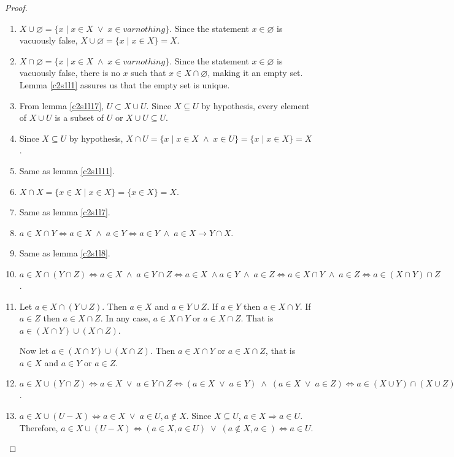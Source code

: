 \begin{proof}
\begin{enumerate}
\item $X \cup \varnothing = \{x\;|\; x \in X \;\lor\; x \in varnothing\}$.
Since the statement $x \in \varnothing$ is vacuously false, $X \cup 
\varnothing = \{x\;|\; x \in X\} = X$.
\item $X \cap \varnothing = \{x\;|\; x \in X \;\land\; x \in varnothing\}$.
Since the statement $x \in \varnothing$ is vacuously false, there is no
$x$ such that $x \in X \cap \varnothing$, making it an empty set. Lemma
\ref{c2s1l1} assures us that the empty set is unique.
\item From lemma \ref{c2s1l17}, $U \subset X \cup U$. Since $X \subseteq
U$ by hypothesis, every element of $X \cup U$ is a subset of $U$ or $X 
\cup U \subseteq U$.
\item Since $X \subseteq U$ by hypothesis, $X \cap U = \{x\;|\; x \in X 
\;\land \; x \in U\} = \{x\;|\; x \in X\} = X$.
\item Same as lemma \ref{c2s1l11}.
\item $X \cap X = \{x \in X \;|\; x \in X\} = \{x \in X\} = X$.
\item Same as lemma \ref{c2s1l7}.
\item $a \in X \cap Y \Leftrightarrow a \in X \;\land\; a \in Y 
\Leftrightarrow a \in Y \;\land\; a \in X \rightarrow Y \cap X$.
\item Same as lemma \ref{c2s1l8}.
\item $a \in X \cap (Y \cap Z) \Leftrightarrow a \in X \;\land\; a \in 
Y \cap Z \Leftrightarrow a \in X \;\land a \in Y \;\land\; a \in Z
\Leftrightarrow a \in X \cap Y \;\land\; a \in Z \Leftrightarrow a \in
(X \cap Y) \cap Z$.
\item Let $a \in X \cap (Y \cup Z)$. Then $a \in X$ and $a \in Y \cup Z$.
If $a \in Y$ then $a \in X \cap Y$. If $a \in Z$ then $a \in X \cap Z$. In
any case, $a \in X \cap Y$ or $a \in X \cap Z$. That is $a \in (X \cap Y) 
\cup (X \cap Z)$.

Now let $a \in (X \cap Y) \cup (X \cap Z)$. Then $a \in X \cap Y$ or $a
\in X \cap Z$, that is $a \in X$ and $a \in Y$ or $a \in Z$.
\item $a \in X \cup (Y \cap Z) \Leftrightarrow a \in X \;\lor\; a \in Y 
\cap Z \Leftrightarrow (a \in X \;\lor\; a \in Y) \;\land\; (a \in X 
\;\lor\; a \in Z) \Leftrightarrow a \in (X \cup Y) \cap (X \cup Z)$.

\item $a \in X \cup (U - X) \Leftrightarrow a \in X \;\lor\; a \in U, a 
\notin X$. Since $X \subseteq U$, $a \in X \Rightarrow a \in U$. Therefore,
$a \in X \cup (U - X) \Leftrightarrow (a \in X, a \in U) \;\lor\; (a \notin
X, a \in ) \Leftrightarrow a \in U$.


\end{enumerate}
\end{proof}
